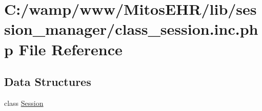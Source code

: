\hypertarget{class__session_8inc_8php}{\section{\-C\-:/wamp/www/\-Mitos\-E\-H\-R/lib/session\-\_\-manager/class\-\_\-session.inc.\-php \-File \-Reference}
\label{class__session_8inc_8php}
}
\subsection*{\-Data \-Structures}
\begin{DoxyCompactItemize}
\item 
class \hyperlink{class_session}{\-Session}
\end{DoxyCompactItemize}

